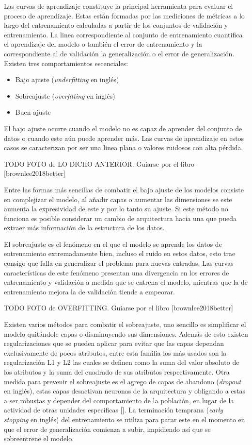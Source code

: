 Las curvas de aprendizaje constituye la principal herramienta para evaluar el proceso de aprendizaje.
Estas están formadas por las mediciones de métricas a lo largo del entrenamiento calculadas a partir de 
los conjuntos de validación y entrenamiento. La linea correspondiente al conjunto de entrenamiento cuantifica 
el aprendizaje del modelo o también el error de entrenamiento y la correspondiente al de validación la 
generalización o el error de generalización. Existen tres comportamientos escenciales:

\begin{itemize}
	\item Bajo ajuste (\emph{underfitting} en inglés)
	\item Sobreajuste (\emph{overfitting} en inglés)
	\item Buen ajuste
\end{itemize}

El bajo ajuste ocurre cuando el modelo no es capaz de aprender del conjunto de datos o cuando este aún puede aprender 
más. Las curvas de aprendizaje en estos casos se caracterizan por ser una linea plana o valores ruidosos con alta pérdida.

TODO FOTO de LO DICHO ANTERIOR. Guiarse por el libro [brownlee2018better]

Entre las formas más sencillas de combatir el bajo ajuste de los modelos consiste en complejizar el modelo, al añadir
capas o aumentar las dimensiones se este aumenta la expresividad de este y por lo tanto su ajuste. Si este método 
no funciona es posible considerar un cambio de arquitectura hacia una que pueda extraer más información de la 
estructura de los datos. 

El sobreajuste es el fenómeno en el que el modelo se aprende los datos de entrenamiento extremadamente bien, incluso
el ruido en estos datos, esto trae consigo que falla en generalizar el problema para nuevas entradas. Las curvas 
características de este fenómeno presentan una divergencia en los errores de entrenamiento y validación a medida
que se entrena el modelo, mientras que la de entrenamiento mejora la de validación tiende a empeorar. 

TODO FOTO de OVERFITTING. Guiarse por el libro [brownlee2018better]

Existen varios métodos para combatir el sobreajuste, uno sencillo es simplificar el modelo quitándole capas 
o disminuyendo sus dimensiones. Además de esto existen regularizaciones que se pueden aplicar para evitar que 
las capas dependan exclusivamente de pocos atributos, entre esta familia los más usados son la regularización
L1 y L2 las cuales se definen como la suma del valor absoluto de los atributos y la suma del cuadrado de sus 
atributos respectivamente. Otra medida para prevenir el sobreajuste es el agrego de capas de abandono 
(\emph{dropout} en inglés), estas capas desactivan neuronas de la arquitectura y obligando a 
estas a ser robustas y depender del comportamiento de la población, en lugar de la actividad de otras unidades 
específicas [\cite{baldi2013dropout}]. La terminación temprana (\emph{early stopping} en inglés) del entrenamiento
se utiliza para parar este en el momento en que el error de generalización comienza a subir, impidiendo así que 
se sobreentrene el modelo.

